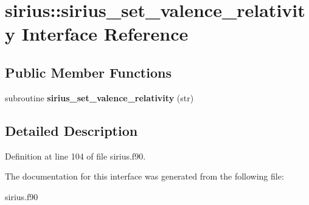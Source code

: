 \hypertarget{interfacesirius_1_1sirius__set__valence__relativity}{}\section{sirius\+:\+:sirius\+\_\+set\+\_\+valence\+\_\+relativity Interface Reference}
\label{interfacesirius_1_1sirius__set__valence__relativity}
\subsection*{Public Member Functions}
\begin{DoxyCompactItemize}
\item 
\hypertarget{interfacesirius_1_1sirius__set__valence__relativity_a6df5ed10dc0b507425105b494249efc5}{}subroutine {\bfseries sirius\+\_\+set\+\_\+valence\+\_\+relativity} (str)\label{interfacesirius_1_1sirius__set__valence__relativity_a6df5ed10dc0b507425105b494249efc5}

\end{DoxyCompactItemize}


\subsection{Detailed Description}


Definition at line 104 of file sirius.\+f90.



The documentation for this interface was generated from the following file\+:\begin{DoxyCompactItemize}
\item 
sirius.\+f90\end{DoxyCompactItemize}
